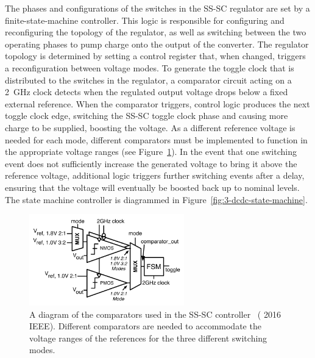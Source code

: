 \documentclass[graybox]{svmult}
\begin{document}
The phases and configurations of the switches in the SS-SC regulator are set by a finite-state-machine controller.
This logic is responsible for configuring and reconfiguring the topology of the regulator, as well as switching between the two operating phases to pump charge onto the output of the converter.
The regulator topology is determined by setting a control register that, when changed, triggers a reconfiguration between voltage modes.
To generate the toggle clock that is distributed to the switches in the regulator, a comparator circuit acting on a \SI{2}{\GHz} clock detects when the regulated output voltage drops below a fixed external reference.
When the comparator triggers, control logic produces the next toggle clock edge, switching the SS-SC toggle clock phase and causing more charge to be supplied, boosting the voltage.
As a different reference voltage is needed for each mode, different comparators must be implemented to function in the appropriate voltage ranges (see Figure~\ref{fig:3-dcdc-comparators}).
In the event that one switching event does not sufficiently increase the generated voltage to bring it above the reference voltage, additional logic triggers further switching events after a delay, ensuring that the voltage will eventually be boosted back up to nominal levels.
The state machine controller is diagrammed in Figure~\ref{fig:3-dcdc-state-machine}.

\begin{figure}
  \centering
  \includegraphics[width=0.6\textwidth]{3-dcdc-comparators}
  \caption{A diagram of the comparators used in the SS-SC controller~\cite{Zimmer2016} ({\textcopyright} 2016 IEEE).  Different comparators are needed to accommodate the voltage ranges of the references for the three different switching modes.}
  \label{fig:3-dcdc-comparators}
\end{figure}
\end{document}

